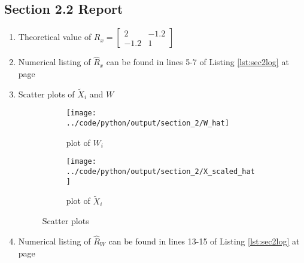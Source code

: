 \documentclass[a4paper,11pt]{article}
\newcommand{\reflst}[1]{Listing \ref{#1} at page \pageref{#1}}
\begin{document}
\subsection*{Section 2.2 Report} 
\begin{enumerate}
 \item Theoretical value of $R_x = \begin{bmatrix}2&-1.2\\-1.2&1\end{bmatrix}$
 \item Numerical listing of $\hat{R}_x$ can be found in lines 5-7 of \reflst{lst:sec2log}
 \item Scatter plots of $\tilde{X}_i$ and $W$
\begin{figure}[!hp]
 \centering
 \begin{subfigure}{0.45\textwidth}
 \texttt{[image: ../code/python/output/section\_2/W\_hat]}
 \caption{plot of $W_i$}
 \end{subfigure}
%  
 \begin{subfigure}{0.45\textwidth}
 \texttt{[image: ../code/python/output/section\_2/X\_scaled\_hat]}
 \caption{plot of $\tilde{X}_i$}
 \end{subfigure}
 \caption{Scatter plots}
\end{figure} 
 
 \item Numerical listing of $\hat{R}_W$ can be found in lines 13-15 of \reflst{lst:sec2log}
\end{enumerate}



%
\clearpage
\vspace{2ex}
\end{document}

